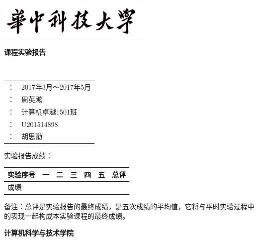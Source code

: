 \documentclass{article}
\newcommand{\coverpage}{
	\thispagestyle{empty}
	\pagenumbering{gobble}
}
\begin{document}
\coverpage
\begin{center}
	{\includegraphics[width=20em]{res/hust.jpg}}\par
	{\fangsong \textbf{\Huge 课程实验报告}} \\[1cm] \par
	{}\\[2cm]	\par

	\begin{tabular}{r m{12em}}
		\makebox[6em][s]{实验时段}：& 2017年3月～2017年5月\\ \cline{2-2}
		\makebox[6em][s]{指导教师}：& 周英飚\\ \cline{2-2}
		\makebox[6em][s]{专业班级}：& 计算机卓越1501班\\ \cline{2-2}
		\makebox[6em][s]{学号}：& U201514898\\ \cline{2-2}
		\makebox[6em][s]{姓名}：& 胡思勖\\ \cline{2-2}
	\end{tabular} \par \vfill
\end{center}

实验报告成绩：\par

\begin{center}
	\begin{tabular}{| m{} | m{} | m{} | m{} | m{} | m{} | m{} |}
		\hline
		实验序号 & 一 & 二 & 三 & 四 & 五 & 总评 \\ \hline
		成绩 & & & & & & \\[4em]
		\hline
	\end{tabular}
\end{center}
备注：总评是实验报告的最终成绩，是五次成绩的平均值，它将与平时实验过程中的表现一起构成本实验课程的最终成绩。

\begin{flushright}
	 \par
\end{flushright}

\begin{center}
	\textbf{\heiti 计算机科学与技术学院}
\end{center}
\end{document}

